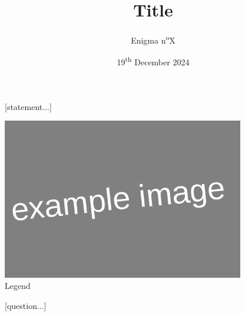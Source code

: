 \documentclass[a4paper, top=10mm]{article}
\title{\textbf{\huge{Title}}}
\author{Enigma n\textsuperscript{o}X}
\date{19\textsuperscript{th} December 2024}
\begin{document}
	\maketitle
	
	[statement...]
	
	\begin{center}
		\includegraphics[height=200pt]{00example.png}\\
		Legend
	\end{center}
	
	[question...]
	
\end{document}
